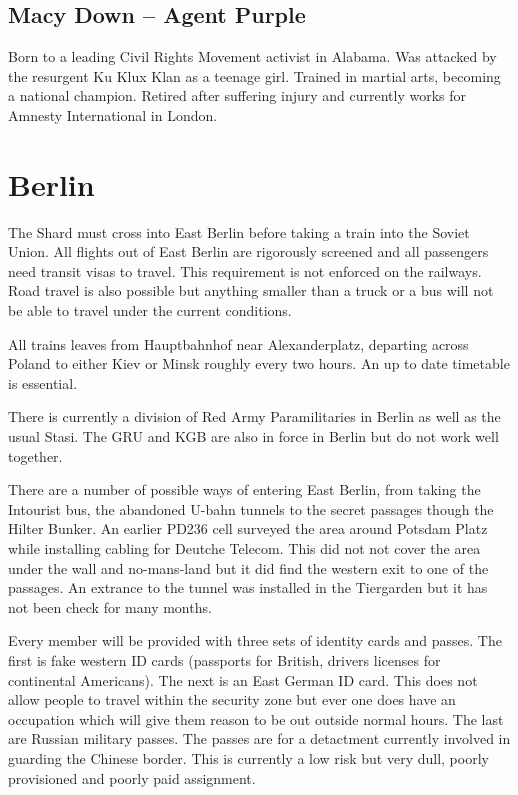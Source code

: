 \documentclass{amsart}
\begin{document}
\begin{multicols}{3}

\subsection{Macy Down -- Agent Purple}

Born to a leading Civil Rights Movement activist in Alabama.  Was
attacked by the resurgent Ku Klux Klan as a teenage girl. Trained in
martial arts, becoming a national champion.  Retired after suffering
injury and currently works for Amnesty International in London.

\section{Berlin}

The Shard must cross into East Berlin before taking a train into the
Soviet Union.  All flights out of East Berlin are rigorously screened
and all passengers need transit visas to travel.  This requirement is
not enforced on the railways.  Road travel is also possible but
anything smaller than a truck or a bus will not be able to travel
under the current conditions.

All trains leaves from Hauptbahnhof near Alexanderplatz, departing
across Poland to either Kiev or Minsk roughly every two hours.  An up
to date timetable is essential.

There is currently a division of Red Army Paramilitaries in Berlin as
well as the usual Stasi.  The GRU and KGB are also in force in Berlin
but do not work well together.

There are a number of possible ways of entering East Berlin, from
taking the Intourist bus, the abandoned U-bahn tunnels to the secret
passages though the Hilter Bunker.  An earlier PD236 cell surveyed the
area around Potsdam Platz while installing cabling for Deutche
Telecom.  This did not not cover the area under the wall and
no-mans-land but it did find the western exit to one of the passages.
An extrance to the tunnel was installed in the Tiergarden but it has
not been check for many months.

Every member will be provided with three sets of identity cards and
passes.  The first is fake western ID cards (passports for British,
drivers licenses for continental Americans).  The next is an East
German ID card.  This does not allow people to travel within the
security zone but ever one does have an occupation which will give
them reason to be out outside normal hours.  The last are Russian
military passes.  The passes are for a detactment currently involved
in guarding the Chinese border.  This is currently a low risk but very
dull, poorly provisioned and poorly paid assignment.


\end{multicols}
\end{document}
